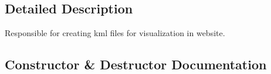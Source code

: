 \subsection{Detailed Description}
\begin{DoxyVerb}Responsible for creating kml files for visualization in website.\end{DoxyVerb}
 

\subsection{Constructor \& Destructor Documentation}
\hypertarget{classmaxkmlgenerator_1_1_max_kml_generator_af8ff7b2f6bf5154c7bfcf636cda6dc0a}{}
